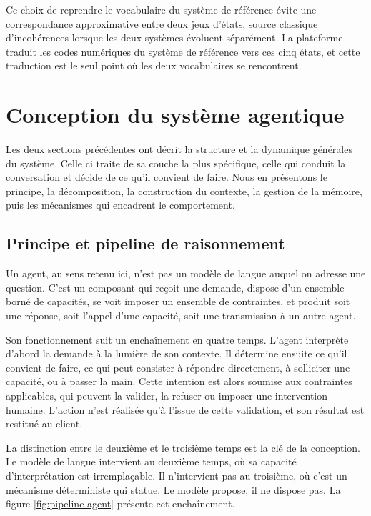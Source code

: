 Ce choix de reprendre le vocabulaire du système de référence évite une correspondance approximative entre deux jeux d'états, source classique d'incohérences lorsque les deux systèmes évoluent séparément. La plateforme traduit les codes numériques du système de référence vers ces cinq états, et cette traduction est le seul point où les deux vocabulaires se rencontrent.


\section{Conception du système agentique}

Les deux sections précédentes ont décrit la structure et la dynamique générales du système. Celle ci traite de sa couche la plus spécifique, celle qui conduit la conversation et décide de ce qu'il convient de faire. Nous en présentons le principe, la décomposition, la construction du contexte, la gestion de la mémoire, puis les mécanismes qui encadrent le comportement.

\subsection{Principe et pipeline de raisonnement}

Un agent, au sens retenu ici, n'est pas un modèle de langue auquel on adresse une question. C'est un composant qui reçoit une demande, dispose d'un ensemble borné de capacités, se voit imposer un ensemble de contraintes, et produit soit une réponse, soit l'appel d'une capacité, soit une transmission à un autre agent.

Son fonctionnement suit un enchaînement en quatre temps. L'agent interprète d'abord la demande à la lumière de son contexte. Il détermine ensuite ce qu'il convient de faire, ce qui peut consister à répondre directement, à solliciter une capacité, ou à passer la main. Cette intention est alors soumise aux contraintes applicables, qui peuvent la valider, la refuser ou imposer une intervention humaine. L'action n'est réalisée qu'à l'issue de cette validation, et son résultat est restitué au client.

La distinction entre le deuxième et le troisième temps est la clé de la conception. Le modèle de langue intervient au deuxième temps, où sa capacité d'interprétation est irremplaçable. Il n'intervient pas au troisième, où c'est un mécanisme déterministe qui statue. Le modèle propose, il ne dispose pas. La figure \ref{fig:pipeline-agent} présente cet enchaînement.

